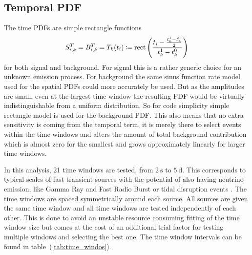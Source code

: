 \subsection*{Temporal PDF}
The time PDFs are simple rectangle functions
\begin{equation}
  S_{i,k}^T = B_{i,k}^T = T_k(t_i) \coloneqq
    \operatorname{rect}\left(\frac{t_i - \frac{t_k^1-t_k^0}{2}}
                              {t_k^1-t_k^0}\right)
\end{equation}
for both signal and background.
For signal this is a rather generic choice for an unknown emission process.
For background the same sinus function rate model used for the spatial PDFs could more accurately be used.
But as the amplitudes are small, even at the largest time window the resulting PDF would be virtually indistinguishable from a uniform distribution.
So for code simplicity simple rectangle model is used for the background PDF.
This also means that no extra sensitivity is coming from the temporal term, it is merely there to select events within the time windows and alters the amount of total background contribution which is almost zero for the smallest and grows approximately linearly for larger time windows.

In this analysis, 21 time windows are tested, from $\SI{2}{\second}$ to $\SI{5}{\day}$.
This corresponds to typical scales of fast transient sources with the potential of also having neutrino emission, like Gamma Ray and Fast Radio Burst or tidal disruption events .
The time windows are spaced symmetrically around each source.
All sources are given the same time window and all time windows are tested independently of each other.
This is done to avoid an unstable resource consuming fitting of the time window size but comes at the cost of an additional trial factor for testing multiple windows and selecting the best one.
The time window intervals can be found in table~(\ref{tab:time_windos}).

